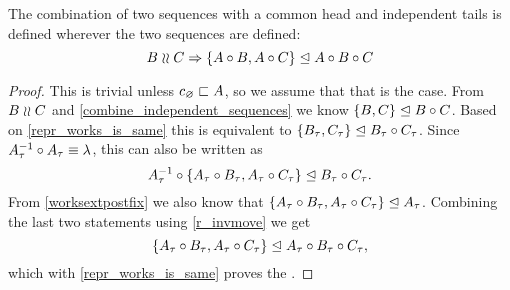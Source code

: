 \begin{mylem}
The combination of two sequences with a common head and independent tails 
is defined wherever the two sequences are defined:
\[ B\mathrel{\wr\wr} C \Rightarrow {\{{A\mathbin{\circ}B, A\mathbin{\circ}C}\}}\trianglelefteq{A\mathbin{\circ}B\mathbin{\circ}C} \]
\end{mylem}
\begin{proof}
This is trivial unless $c_\varnothing\sqsubset{A}$, so we assume that that is the case.
From $B\mathrel{\wr\wr} C$ and \cref{combine_independent_sequences} we know
${\{{B, C}\}}\trianglelefteq{B\mathbin{\circ}C}$.
Based on \cref{repr_works_is_same} this is equivalent to
${\{{{B}_\tau, {C}_\tau}\}}\trianglelefteq{{B}_\tau\mathbin{\circ}{C}_\tau}$.
Since ${A}_\tau^{-1}\mathbin{\circ} {A}_\tau \equiv \lambda$, this can also be written as
\[{{A}_\tau^{-1}\mathbin{\circ}\{{A}_\tau\mathbin{\circ} {B}_\tau, {A}_\tau\mathbin{\circ} {C}_\tau\}}\trianglelefteq{{B}_\tau\mathbin{\circ}{C}_\tau}.\]
From \cref{worksextpostfix} we also know that
${\{{{A}_\tau\mathbin{\circ} {B}_\tau, {A}_\tau\mathbin{\circ} {C}_\tau}\}}\trianglelefteq{{A}_\tau}$.
Combining the last two statements using \cref{r_invmove}
we get
\[ {\{{{A}_\tau\mathbin{\circ} {B}_\tau, {A}_\tau\mathbin{\circ} {C}_\tau}\}}\trianglelefteq{{A}_\tau\mathbin{\circ}{B}_\tau\mathbin{\circ}{C}_\tau}, \]
which with \cref{repr_works_is_same} proves the
.
\end{proof}
